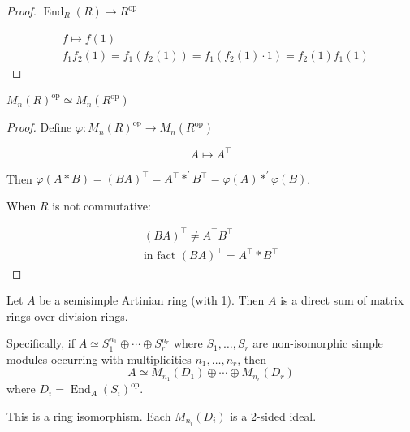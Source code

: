 \documentclass[11pt, a4paper]{report}
\begin{document}
\begin{proof}
$\operatorname{End}_{R}(R) \rightarrow R^{\mathrm{op}}$

\[
\begin{aligned}
& f \mapsto f(1) \\
& f_{1} f_{2}(1)=f_{1}\left(f_{2}(1)\right)=f_{1}\left(f_{2}(1) \cdot 1\right)=f_{2}(1) f_{1}(1)
\end{aligned}
\]

\end{proof}

\begin{lemma}
$M_{n}(R)^{\mathrm{op}} \simeq M_{n}\left(R^{\mathrm{op}}\right)$
\end{lemma}

\begin{proof}
Define $\varphi: M_{n}(R)^{\mathrm{op}} \rightarrow M_{n}\left(R^{\mathrm{op}}\right)$

\[
A \mapsto A^{\top}
\]

Then $\varphi(A * B)=(B A)^{\top}=A^{\top} *^{\prime} B^{\top}=\varphi(A) *^{\prime} \varphi(B)$.

When $R$ is not commutative:

\[
\begin{gathered}
(B A)^{\top} \neq A^{\top} B^{\top} \\
\text{in fact } (B A)^{\top}=A^{\top} * B^{\top}
\end{gathered}
\]

\end{proof}

\begin{theorem}
Let $A$ be a semisimple Artinian ring (with 1). Then $A$ is a direct sum of matrix rings over division rings.

Specifically, if $A \simeq S_{1}^{n_{1}} \oplus \cdots \oplus S_{r}^{n_{r}}$ where $S_{1}, \ldots, S_{r}$ are non-isomorphic simple modules occurring with multiplicities $n_{1}, \ldots, n_{r}$, then
\[
A \simeq M_{n_{1}}\left(D_{1}\right) \oplus \cdots \oplus M_{n_{r}}\left(D_{r}\right)
\]
where $D_{i}=\operatorname{End}_{A}\left(S_{i}\right)^{\mathrm{op}}$.

This is a ring isomorphism. Each $M_{n_{i}}\left(D_{i}\right)$ is a 2-sided ideal.
\end{theorem}
\end{document}
